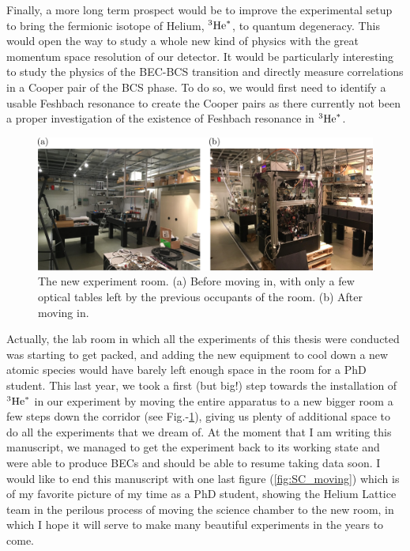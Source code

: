 Finally, a more long term prospect would be to improve the experimental setup to bring the fermionic isotope of Helium, $^3\mathrm{He}^*$, to quantum degeneracy. This would open the way to study a whole new kind of physics with the great momentum space resolution of our detector. It would be particularly interesting to study the physics of the BEC-BCS transition and directly measure \kmk correlations in a Cooper pair of the BCS phase. To do so, we would first need to identify a usable Feshbach resonance to create the Cooper pairs as there currently not been a proper investigation of the existence of Feshbach resonance in $^3\mathrm{He}^*$. 

\renewcommand{\thefigure}{1}
\begin{figure}[h!]
    \centering
    \includegraphics[width=\textwidth]{Fig/Conclusion/before_after.png}
    \caption{The new experiment room. (a) Before moving in, with only a few optical tables left by the previous occupants of the room. (b) After moving in. }
    \label{fig:before_after}
\end{figure}

Actually, the lab room in which all the experiments of this thesis were conducted was starting to get packed, and adding the new equipment to cool down a new atomic species would have barely left enough space in the room for a PhD student. This last year, we took a first (but big!) step towards the installation of $^3\mathrm{He}^*$ in our experiment by moving the entire apparatus to a new bigger room a few steps down the corridor (see Fig.-\ref{fig:before_after}), giving us plenty of additional space to do all the experiments that we dream of. At the moment that I am writing this manuscript, we managed to get the experiment back to its working state and were able to produce BECs and should be able to resume taking data soon. I would like to end this manuscript with one last figure (\ref{fig:SC_moving}) which is of my favorite picture of my time as a PhD student, showing the Helium Lattice team in the perilous process of moving the science chamber to the new room, in which I hope it will serve to make many beautiful experiments in the years to come.



